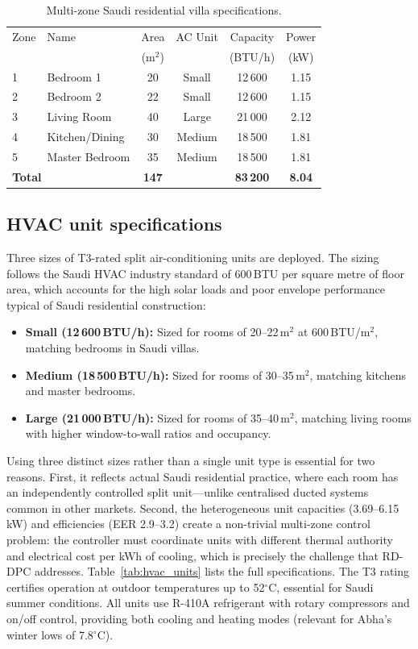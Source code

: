 \documentclass[12pt]{article}
\theoremstyle{plain}
\theoremstyle{definition}
\begin{document}
\begin{table}[H]
\centering
\caption{Multi-zone Saudi residential villa specifications.}\label{tab:zones}

\begin{tabular*}{\textwidth}{@{\extracolsep{\fill}}llcccc}
\toprule
Zone & Name & Area & AC Unit & Capacity & Power \\
     &      & (m$^2$) &    & (BTU/h) & (kW) \\
\midrule
1 & Bedroom 1     & 20 & Small  & 12\,600 & 1.15 \\
2 & Bedroom 2     & 22 & Small  & 12\,600 & 1.15 \\
3 & Living Room   & 40 & Large  & 21\,000 & 2.12 \\
4 & Kitchen/Dining & 30 & Medium & 18\,500 & 1.81 \\
5 & Master Bedroom & 35 & Medium & 18\,500 & 1.81 \\
\midrule
\multicolumn{2}{l}{\textbf{Total}} & \textbf{147} & & \textbf{83\,200} & \textbf{8.04} \\
\bottomrule
\end{tabular*}
\end{table}

\subsection{HVAC unit specifications}\label{sec:hvac_specs}

Three sizes of T3-rated split air-conditioning units are deployed. The sizing follows the Saudi HVAC industry standard of 600\,BTU per square metre of floor area, which accounts for the high solar loads and poor envelope performance typical of Saudi residential construction:
\begin{itemize}[leftmargin=*, nosep]
\item \textbf{Small (12\,600\,BTU/h):} Sized for rooms of 20--22\,m$^2$ at 600\,BTU/m$^2$, matching bedrooms in Saudi villas.
\item \textbf{Medium (18\,500\,BTU/h):} Sized for rooms of 30--35\,m$^2$, matching kitchens and master bedrooms.
\item \textbf{Large (21\,000\,BTU/h):} Sized for rooms of 35--40\,m$^2$, matching living rooms with higher window-to-wall ratios and occupancy.
\end{itemize}
Using three distinct sizes rather than a single unit type is essential for two reasons. First, it reflects actual Saudi residential practice, where each room has an independently controlled split unit---unlike centralised ducted systems common in other markets. Second, the heterogeneous unit capacities (3.69--6.15\,kW) and efficiencies (EER 2.9--3.2) create a non-trivial multi-zone control problem: the controller must coordinate units with different thermal authority and electrical cost per kWh of cooling, which is precisely the challenge that RD-DPC addresses. Table~\ref{tab:hvac_units} lists the full specifications. The T3 rating certifies operation at outdoor temperatures up to 52$^\circ$C, essential for Saudi summer conditions. All units use R-410A refrigerant with rotary compressors and on/off control, providing both cooling and heating modes (relevant for Abha's winter lows of 7.8$^\circ$C).
\end{document}
